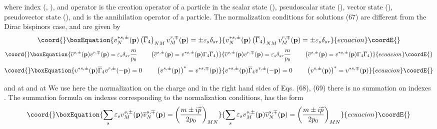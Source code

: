 \documentclass[a4paper,12pt]{article}
\begin{document}
where index \coordHE{} (\coordHE{}, \coordHE{}),
and operator \coordHE{} is the creation operator of a
particle in the scalar state (\coordHE{}), pseudoscalar state
(\coordHE{}), vector state (\coordHE{}), pseudovector state
(\coordHE{}), and \coordHE{} is the
annihilation operator of a particle. The normalization conditions
for solutions (67) are different from the Dirac bispinors case,
and are given by
\begin{equation}\coord{}\boxEquation{
v_N^{*s,\pm }(\mathbf{p})\left( \overline{\Gamma }_4\right) _{NM}v_M^{r,\mp
}(\mathbf{p})=\pm \varepsilon _s\delta _{sr}  \label{68}
}{
v_N^{*s,\pm }(\mathbf{p})\left( \overline{\Gamma }_4\right) _{NM}v_M^{r,\mp
}(\mathbf{p})=\pm \varepsilon _s\delta _{sr}  }{ecuacion}\coordE{}\end{equation}
\begin{equation}\coord{}\boxEquation{
\overline{v}^{s,\pm }(\mathbf{p})v^{r,\mp
}(\mathbf{p})=\varepsilon _s\delta _{sr}\frac
m{p_0}\hspace{0.3in}\left( \overline{v}^{s,\pm }(\mathbf{p}
)=v^{*s,\pm }(\mathbf{p})\Gamma _4\overline{\Gamma }_4\right)
\label{69}
}{
\overline{v}^{s,\pm }(\mathbf{p})v^{r,\mp
}(\mathbf{p})=\varepsilon _s\delta _{sr}\frac
m{p_0}\hspace{0.3in}\left( \overline{v}^{s,\pm }(\mathbf{p}
)=v^{*s,\pm }(\mathbf{p})\Gamma _4\overline{\Gamma }_4\right)
}{ecuacion}\coordE{}\end{equation}
\begin{equation}\coord{}\boxEquation{
v^{*s,\pm }(\mathbf{p})\overline{\Gamma }_4v^{r,\pm
}(-\mathbf{p})=0 \hspace{0.3in}\left( v^{s,\pm
}(\mathbf{p})\right) ^{*}=v^{*s,\mp }(\mathbf{p })  \label{70}
}{
v^{*s,\pm }(\mathbf{p})\overline{\Gamma }_4v^{r,\pm
}(-\mathbf{p})=0 \hspace{0.3in}\left( v^{s,\pm
}(\mathbf{p})\right) ^{*}=v^{*s,\mp }(\mathbf{p })  }{ecuacion}\coordE{}\end{equation}

and \coordHE{} at \coordHE{}  \coordHE{} and \coordHE{} at \coordHE{}  \coordHE{} We use here the normalization on
the charge and in the right hand sides of Eqs. (68), (69) there is
no summation on indexes \coordHE{} . The summation formula on indexes \coordHE{}
corresponding to the normalization conditions, has the form
\begin{equation}\coord{}\boxEquation{
\sum_s\varepsilon _sv_M^{s,\pm }(\mathbf{p})\overline{v}_N^{s,\mp
}(\mathbf{p })=\left( \frac{m\pm i\widehat{p}}{2p_0}\right) _{MN}
\label{71}
}{
\sum_s\varepsilon _sv_M^{s,\pm }(\mathbf{p})\overline{v}_N^{s,\mp
}(\mathbf{p })=\left( \frac{m\pm i\widehat{p}}{2p_0}\right) _{MN}
}{ecuacion}\coordE{}\end{equation}
\end{document}
